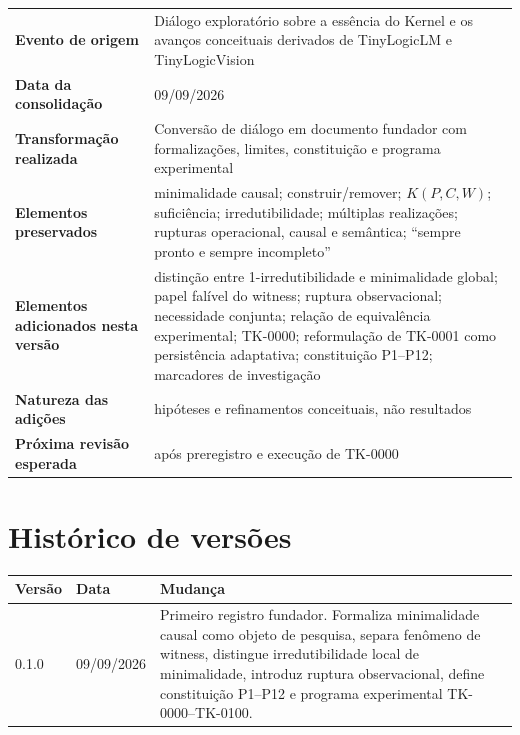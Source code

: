 \documentclass[11pt,a4paper]{article}
\begin{document}
\begin{tabularx}{\textwidth}{>{\bfseries}p{4.1cm}X}
\toprule
Evento de origem & Diálogo exploratório sobre a essência do Kernel e os avanços
conceituais derivados de TinyLogicLM e TinyLogicVision \\
Data da consolidação & 09/09/2026 \\
Transformação realizada & Conversão de diálogo em documento fundador com
formalizações, limites, constituição e programa experimental \\
Elementos preservados & minimalidade causal; construir/remover; \(K(P,C,W)\);
suficiência; irredutibilidade; múltiplas realizações; rupturas operacional, causal e
semântica; ``sempre pronto e sempre incompleto'' \\
Elementos adicionados nesta versão & distinção entre 1-irredutibilidade e minimalidade
global; papel falível do witness; ruptura observacional; necessidade conjunta;
relação de equivalência experimental; TK-0000; reformulação de TK-0001 como
persistência adaptativa; constituição P1--P12; marcadores de investigação \\
Natureza das adições & hipóteses e refinamentos conceituais, não resultados \\
Próxima revisão esperada & após preregistro e execução de TK-0000 \\
\bottomrule
\end{tabularx}

\section{Histórico de versões}

\begin{longtable}{p{2.2cm}p{2.8cm}p{9.4cm}}
\toprule
Versão & Data & Mudança \\
\midrule
\endhead
0.1.0 & 09/09/2026 &
Primeiro registro fundador. Formaliza minimalidade causal como objeto de pesquisa,
separa fenômeno de witness, distingue irredutibilidade local de minimalidade,
introduz ruptura observacional, define constituição P1--P12 e programa experimental
TK-0000--TK-0100. \\
\bottomrule
\end{longtable}
\end{document}
